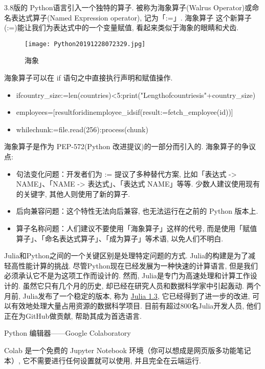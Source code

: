 3.8版的 Python语言引入一个独特的算子. 被称为海象算子(Walrus Operator)或命名表达式算子(Named Expression operator), 记为「:=」. 海象算子 这个新算子(:=)能让我们为表达式中的一个变量赋值, 看起来类似于海象的眼睛和犬齿.
\begin{figure}[htbp]
\centering
\texttt{[image: Python20191228072329.jpg]}
\caption{海象}
\label{Python2019122807232918}
\end{figure}
\begin{example}
海象算子可以在 if 语句之中直接执行声明和赋值操作.
\begin{itemize}
\item ifcountry\_size:=len(countries)<5:print("Lengthofcountriesis"+country\_size)
\item employees=[resultforidinemployee\_idsif(result:=fetch\_employee(id))]
\item whilechunk:=file.read(256):process(chunk)
\end{itemize}
\end{example}

海象算子是作为 PEP-572(Python 改进提议)的一部分而引入的. 海象算子的争议点:
\begin{itemize}
\item 句法变化问题：开发者们为 := 提议了多种替代方案, 比如「表达式 -> NAME」、「NAME -> 表达式」、「{表达式} NAME」等等. 少数人建议使用现有的关键字, 其他人则使用了新的算子.
\item 后向兼容问题：这个特性无法向后兼容, 也无法运行在之前的 Python 版本上.
\item 算子名称问题：人们建议不要使用「海象算子」这样的代号, 而是使用「赋值算子」、「命名表达式算子」、「成为算子」等术语, 以免人们不明白.
\end{itemize}

Julia和Python之间的一个关键区别是处理特定问题的方式. Julia的构建是为了减轻高性能计算的挑战. 尽管Python现在已经发展为一种快速的计算语言, 但是我们必须承认它不是为这项工作而设计的. 然而, Julia是专门为高速处理和计算工作设计的. 虽然它只有几个月的历史, 却已经在研究人员和数据科学家中引起轰动.
两个月前, Julia发布了一个稳定的版本, 称为 \href{https://julialang.org/}{Julia 1.3}, 它已经得到了进一步的改进, 可以有效地处理大量占用资源的数据科学项目. 目前有超过800名Julia开发人员, 他们正在为GitHub做贡献, 帮助其成为首选语言.

Python 编辑器——Google Colaboratory

Colab 是一个免费的 Jupyter Notebook 环境（你可以想成是网页版多功能笔记本）, 它不需要进行任何设置就可以使用, 并且完全在云端运行.

